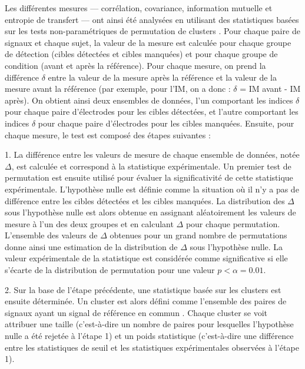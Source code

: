 Les différentes mesures --- corrélation, covariance, information mutuelle et entropie de transfert --- ont ainsi été analysées en utilisant des statistiques basées sur les tests non-paramétriques de permutation de clusters \citep{maris2007nonparametric, maris2007nonparametricstats, nichols2002nonparametric}. 
Pour chaque paire de signaux et chaque sujet, la valeur de la mesure est calculée pour chaque groupe de détection (cibles détectées et cibles manquées) et pour chaque groupe de condition (avant et après la référence). 
Pour chaque mesure, on prend la différence $\delta$ entre la valeur de la mesure après la référence et la valeur de la mesure avant la référence (par exemple, pour l'IM, on a donc : $\delta$ = IM avant - IM après). 
On obtient ainsi deux ensembles de données, l'un comportant les indices $\delta$ pour chaque paire d'électrodes pour les cibles détectées, et l'autre comportant les indices $\delta$ pour chaque paire d'électrodes pour les cibles manquées. 
Ensuite, pour chaque mesure, le test est composé des étapes suivantes :

1. La différence entre les valeurs de mesure de chaque ensemble de données, notée $\Delta$, est calculée et correspond à la statistique expérimentale. 
Un premier test de permutation est ensuite utilisé pour évaluer la significativité de cette statistique expérimentale. 
L'hypothèse nulle est définie comme la situation où il n'y a pas de différence entre les cibles détectées et les cibles manquées. 
La distribution des $\Delta$ sous l'hypothèse nulle est alors obtenue en assignant aléatoirement les valeurs de mesure à l'un des deux groupes et en calculant $\Delta$ pour chaque permutation. 
L'ensemble des valeurs de $\Delta$ obtenues pour un grand nombre de permutations donne ainsi une estimation de la distribution de $\Delta$ sous l'hypothèse nulle. 
La valeur expérimentale de la statistique est considérée comme significative si elle s'écarte de la distribution de permutation pour une valeur $p<\alpha=0.01$. 

2. Sur la base de l'étape précédente, une statistique basée sur les clusters est ensuite déterminée. 
Un cluster est alors défini comme l'ensemble des paires de signaux ayant un signal de référence en commun \citep{maris2007nonparametric}. 
Chaque cluster se voit attribuer une taille (c'est-à-dire un nombre de paires pour lesquelles l'hypothèse nulle a été rejetée à l'étape 1) et un poids statistique (c'est-à-dire une différence entre les statistiques de seuil et les statistiques expérimentales observées à l'étape 1).

